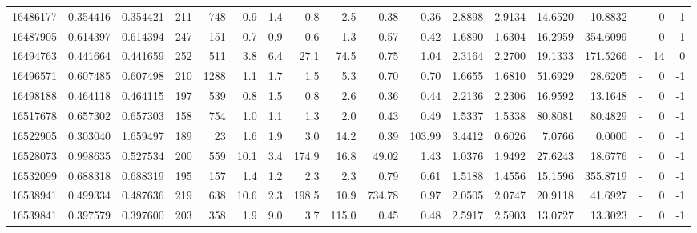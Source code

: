 \begin{tabular}{rrrrrrrrrrrrrrrlrr}
  16486177 & 0.354416 &   0.354421 &  211 &  748 &      0.9 &      1.4 &     0.8 &      2.5 &       0.38 &        0.36 &  2.8898 &  2.9134 &   14.6520 &   10.8832 &             - &        0 &         -1 \\
  16487905 & 0.614397 &   0.614394 &  247 &  151 &      0.7 &      0.9 &     0.6 &      1.3 &       0.57 &        0.42 &  1.6890 &  1.6304 &   16.2959 &  354.6099 &             - &        0 &         -1 \\
  16494763 & 0.441664 &   0.441659 &  252 &  511 &      3.8 &      6.4 &    27.1 &     74.5 &       0.75 &        1.04 &  2.3164 &  2.2700 &   19.1333 &  171.5266 &             - &       14 &          0 \\
  16496571 & 0.607485 &   0.607498 &  210 & 1288 &      1.1 &      1.7 &     1.5 &      5.3 &       0.70 &        0.70 &  1.6655 &  1.6810 &   51.6929 &   28.6205 &             - &        0 &         -1 \\
  16498188 & 0.464118 &   0.464115 &  197 &  539 &      0.8 &      1.5 &     0.8 &      2.6 &       0.36 &        0.44 &  2.2136 &  2.2306 &   16.9592 &   13.1648 &             - &        0 &         -1 \\
  16517678 & 0.657302 &   0.657303 &  158 &  754 &      1.0 &      1.1 &     1.3 &      2.0 &       0.43 &        0.49 &  1.5337 &  1.5338 &   80.8081 &   80.4829 &             - &        0 &         -1 \\
  16522905 & 0.303040 &   1.659497 &  189 &   23 &      1.6 &      1.9 &     3.0 &     14.2 &       0.39 &      103.99 &  3.4412 &  0.6026 &    7.0766 &    0.0000 &             - &        0 &         -1 \\
  16528073 & 0.998635 &   0.527534 &  200 &  559 &     10.1 &      3.4 &   174.9 &     16.8 &      49.02 &        1.43 &  1.0376 &  1.9492 &   27.6243 &   18.6776 &             - &        0 &         -1 \\
  16532099 & 0.688318 &   0.688319 &  195 &  157 &      1.4 &      1.2 &     2.3 &      2.3 &       0.79 &        0.61 &  1.5188 &  1.4556 &   15.1596 &  355.8719 &             - &        0 &         -1 \\
  16538941 & 0.499334 &   0.487636 &  219 &  638 &     10.6 &      2.3 &   198.5 &     10.9 &     734.78 &        0.97 &  2.0505 &  2.0747 &   20.9118 &   41.6927 &             - &        0 &         -1 \\
  16539841 & 0.397579 &   0.397600 &  203 &  358 &      1.9 &      9.0 &     3.7 &    115.0 &       0.45 &        0.48 &  2.5917 &  2.5903 &   13.0727 &   13.3023 &             - &        0 &         -1 \\

\end{tabular}

